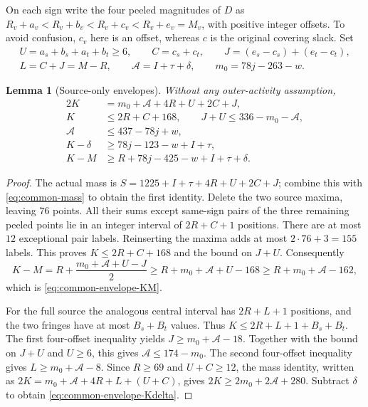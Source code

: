 \documentclass[11pt,letterpaper]{article}
\newtheorem{lemma}[theorem]{Lemma}
\theoremstyle{definition}\newtheorem{definition}[theorem]{Definition}
\begin{document}
On each sign write the four peeled magnitudes of $D$ as
$R_v+a_v<R_v+b_v<R_v+c_v<R_v+e_v=M_v$, with positive integer
offsets. To avoid confusion, $c_v$ here is an offset, whereas $c$ is
the original covering slack. Set
\[
\begin{gathered}
U=a_s+b_s+a_t+b_t\ge6,\qquad C=c_s+c_t,\qquad
J=(e_s-c_s)+(e_t-c_t),\\
L=C+J=M-R,\qquad\mathcal A=I+\tau+\delta,\qquad m_0=78j-263-w.
\end{gathered}
\]
\begin{lemma}[Source-only envelopes]\label{lem:common-envelope}
Without any outer-activity assumption,
\begin{align}
2K&=m_0+\mathcal A+4R+U+2C+J,\label{eq:common-envelope-mass}\\
K&\le2R+C+168,\qquad J+U\le336-m_0-\mathcal A,\label{eq:common-two-max}\\
\mathcal A&\le437-78j+w,\label{eq:common-envelope-A}\\
K-\delta&\ge78j-123-w+I+\tau,\label{eq:common-envelope-Kdelta}\\
K-M&\ge R+78j-425-w+I+\tau+\delta.\label{eq:common-envelope-KM}
\end{align}
\end{lemma}
\begin{proof}
The actual mass is $S=1225+I+\tau+4R+U+2C+J$; combine this
with \eqref{eq:common-mass} to obtain the first identity.
Delete the two source maxima, leaving $76$ points. All their sums
except same-sign pairs of the three remaining peeled points lie in
an integer interval of $2R+C+1$ positions. There are at most $12$
exceptional pair labels. Reinserting the maxima adds at most
$2\cdot76+3=155$ labels. This proves $K\le2R+C+168$ and the
bound on $J+U$. Consequently
\[
K-M=R+\frac{m_0+\mathcal A+U-J}{2}
\ge R+m_0+\mathcal A+U-168
\ge R+m_0+\mathcal A-162,
\]
which is \eqref{eq:common-envelope-KM}.

For the full source the analogous central interval has $2R+L+1$
positions, and the two fringes have at most $B_s+B_t$ values. Thus
$K\le2R+L+1+B_s+B_t$. The first four-offset inequality yields
$J\ge m_0+\mathcal A-18$. Together with the bound on $J+U$ and
$U\ge6$, this gives $\mathcal A\le174-m_0$.
The second four-offset inequality gives $L\ge m_0+\mathcal A-8$.
Since $R\ge69$ and $U+C\ge12$, the mass identity, written as
$2K=m_0+\mathcal A+4R+L+(U+C)$, gives
$2K\ge2m_0+2\mathcal A+280$.
Subtract $\delta$ to obtain \eqref{eq:common-envelope-Kdelta}.
\end{proof}
\end{document}
